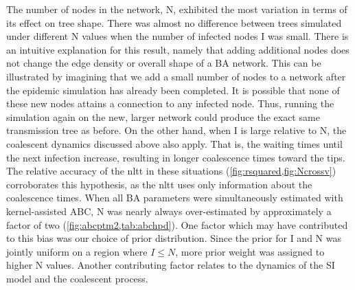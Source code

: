 The number of nodes in the network, \gls{N}, exhibited the most variation in
terms of its effect on tree shape. There was almost no difference between trees
simulated under different \gls{N} values when the number of infected nodes
\gls{I} was small. There is an intuitive explanation for this result, namely
that adding additional nodes does not change the edge density or overall shape
of a \gls{BA} network. This can be illustrated by imagining that we add a small
number of nodes to a network after the epidemic simulation has already been
completed. It is possible that none of these new nodes attains a connection to
any infected node. Thus, running the simulation again on the new, larger
network could produce the exact same transmission tree as before. On the other
hand, when \gls{I} is large relative to \gls{N}, the coalescent dynamics
discussed above also apply. That is, the waiting times until the next infection
increase, resulting in longer coalescence times toward the tips. The relative
accuracy of the \gls{nltt} in these situations
(\cref{fig:rsquared,fig:Ncrossv}) corroborates this hypothesis, as the
\gls{nltt} uses only information about the coalescence times. When all \gls{BA}
parameters were simultaneously estimated with kernel-assisted \gls{ABC}, \gls{N} was
nearly always over-estimated by approximately a factor of two
(\cref{fig:abcptm2,tab:abchpd}). One factor which may have contributed to this
bias was our choice of prior distribution. Since the prior for \gls{I} and
\gls{N} was jointly uniform on a region where $I \leq N$, more prior weight was
assigned to higher \gls{N} values. Another contributing factor relates to the
dynamics of the \gls{SI} model and the coalescent process.

